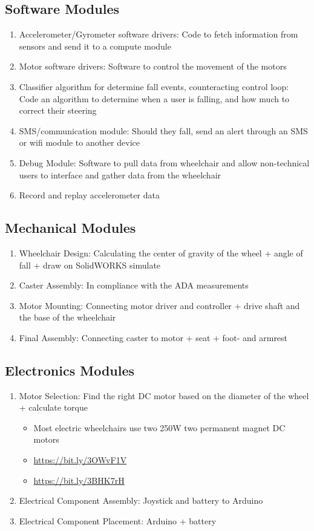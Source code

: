 \documentclass[11pt]{article}
\begin{document}
\subsection{Software Modules}
\label{sec:org7608000}
\begin{enumerate}
\item Accelerometer/Gyrometer software drivers: Code to fetch information from sensors and send it to a compute module
\item Motor software drivers: Software to control the movement of the motors
\item Classifier algorithm for determine fall events, counteracting control loop: Code an algorithm to determine when a user is falling, and how much to correct their steering
\item SMS/communication module: Should they fall, send an alert through an SMS or wifi module to another device
\item Debug Module: Software to pull data from wheelchair and allow non-technical users to interface and gather data from the wheelchair
\item Record and replay accelerometer data
\end{enumerate}

\subsection{Mechanical Modules}
\label{sec:orgdc791a7}
\begin{enumerate}
\item Wheelchair Design: Calculating the center of gravity of the wheel + angle of fall + draw on SolidWORKS simulate
\item Caster Assembly: In compliance with the ADA measurements
\item Motor Mounting:  Connecting motor driver and controller + drive shaft and the base of the wheelchair
\item Final Assembly: Connecting caster to motor + seat + foot- and armrest
\end{enumerate}

\subsection{Electronics Modules}
\label{sec:orgb5a72b8}
\begin{enumerate}
\item Motor Selection: Find the right DC motor based on the diameter of the wheel + calculate torque
\begin{itemize}
\item Most electric wheelchairs use two 250W two permanent magnet DC motors
\item \url{https://bit.ly/3OWvF1V}
\item \url{https://bit.ly/3BHK7rH}
\end{itemize}
\item Electrical Component Assembly: Joystick and battery to Arduino
\item Electrical Component Placement: Arduino + battery
\end{enumerate}
\end{document}
